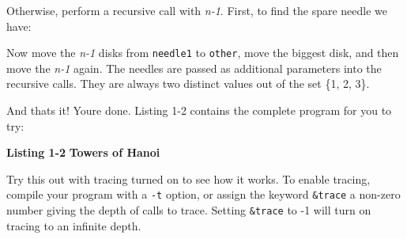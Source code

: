 Otherwise, perform a recursive call with \textit{n-1}. First, to find
the spare needle we have:


Now move the \textit{n-1} disks from \texttt{needle1} to \texttt{other},
move the biggest disk, and then move the \textit{n-1} again. The
needles are passed as additional parameters into the recursive calls.
They are always two distinct values out of the set \{1, 2, 3\}.


And that{\textquotesingle}s it! You{\textquotesingle}re done. Listing
1-2 contains the complete program for you to try:

\bigskip

{\sffamily\bfseries Listing 1-2}
{\sffamily\bfseries Towers of Hanoi}


Try this out with tracing turned on to see how it works.
To enable tracing, compile your program with a
\texttt{{}-t} option, or assign the keyword \texttt{\&trace} a non-zero
number giving the depth of calls to trace. Setting \texttt{\&trace} to
-1 will turn on tracing to an infinite depth.

